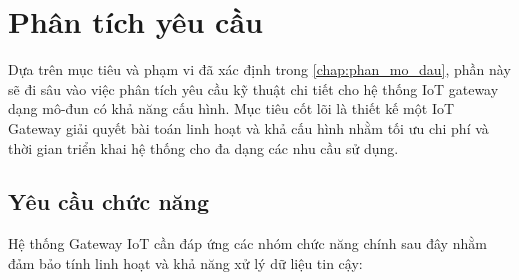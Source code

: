 \section{Phân tích yêu cầu}\label{sec:phan_tich_chung}
    
    Dựa trên mục tiêu và phạm vi đã xác định trong \autoref{chap:phan_mo_dau}, phần này sẽ đi sâu vào việc phân tích yêu cầu kỹ thuật chi tiết cho hệ thống IoT gateway dạng mô-đun có khả năng cấu hình. Mục tiêu cốt lõi là thiết kế một IoT Gateway giải quyết bài toán linh hoạt và khả cấu hình nhằm tối ưu chi phí và thời gian triển khai hệ thống cho đa dạng các nhu cầu sử dụng.

    \subsection{Yêu cầu chức năng}
        
    Hệ thống Gateway IoT cần đáp ứng các nhóm chức năng chính sau đây nhằm đảm bảo tính linh hoạt và khả năng xử lý dữ liệu tin cậy:

